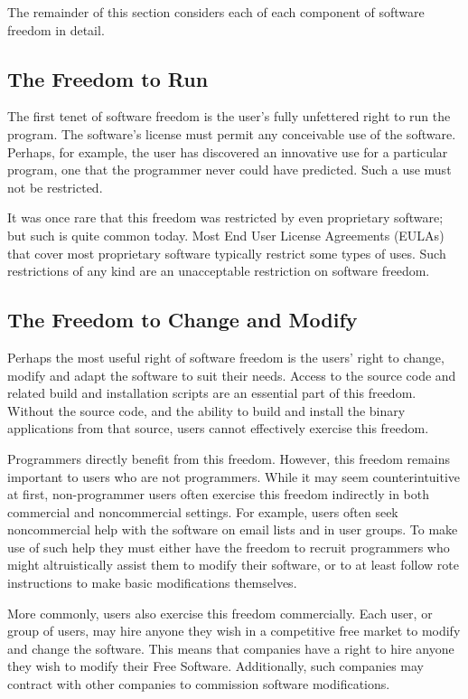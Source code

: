 The remainder of this section considers each of each component of software
freedom in detail.

\subsection{The Freedom to Run}
\label{freedom-to-run}

The first tenet of software freedom is the user's fully unfettered right to
run the program.  The software's license must permit any conceivable use of
the software.  Perhaps, for example, the user has discovered an innovative
use for a particular program, one that the programmer never could have
predicted.  Such a use must not be restricted.

It was once rare that this freedom was restricted by even proprietary
software; but such is quite common today. Most End User License Agreements
(EULAs) that cover most proprietary software typically restrict some types of
uses.  Such restrictions of any kind are an unacceptable restriction on
software freedom.

\subsection{The Freedom to Change and Modify}

Perhaps the most useful right of software freedom is the users' right to
change, modify and adapt the software to suit their needs.  Access to the
source code and related build and installation scripts are an essential part
of this freedom.  Without the source code, and the ability to build and
install the binary applications from that source, users cannot effectively
exercise this freedom.

Programmers directly benefit from this freedom.  However, this freedom
remains important to users who are not programmers.  While it may seem
counterintuitive at first, non-programmer users often exercise this freedom
indirectly in both commercial and noncommercial settings.  For example, users
often seek noncommercial help with the software on email lists and in user
groups.  To make use of such help they must either have the freedom to
recruit programmers who might altruistically assist them to modify their
software, or to at least follow rote instructions to make basic modifications
themselves.

More commonly, users also exercise this freedom commercially.  Each user, or
group of users, may hire anyone they wish in a competitive free market to
modify and change the software.  This means that companies have a right to
hire anyone they wish to modify their Free Software.  Additionally, such
companies may contract with other companies to commission software
modifications.

